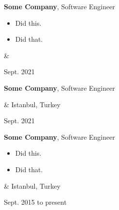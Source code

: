 \documentclass[10pt, letterpaper]{article}
\newenvironment{highlights}{
        \begin{itemize}[
                topsep=0pt,
                parsep=0.10 cm,
                partopsep=0pt,
                itemsep=0pt,
                after=\relax,
                leftmargin=0.4 cm + 3pt
            ]
    }{
        \end{itemize}
    } %
\let\originalTabularx\tabularx
\let\originalEndTabularx\endtabularx
\renewenvironment{tabularx}{\bgroup\centering\originalTabularx}{\originalEndTabularx\par\egroup}
\begin{document}
        \vspace{0.2 cm}
        \begin{tabularx}{
            \textwidth-0.4 cm-0.13cm
        }{
            K{0.2 cm}
            R{4.1 cm}
        }
            \textbf{Some Company}, Software Engineer

            \vspace{0.10 cm}

            \begin{highlights}
                \item Did this.
                \item Did that.
            \end{highlights}
            &
            

            Sept. 2021
        \end{tabularx}

        \vspace{0.2 cm}
        \begin{tabularx}{
            \textwidth-0.4 cm-0.13cm
        }{
            K{0.2 cm}
            R{4.1 cm}
        }
            \textbf{Some Company}, Software Engineer

            \vspace{0.10 cm}

            &
            Istanbul, Turkey

            Sept. 2021
        \end{tabularx}

        \vspace{0.2 cm}
        \begin{tabularx}{
            \textwidth-0.4 cm-0.13cm
        }{
            K{0.2 cm}
            R{4.1 cm}
        }
            \textbf{Some Company}, Software Engineer

            \vspace{0.10 cm}

            \begin{highlights}
                \item Did this.
                \item Did that.
            \end{highlights}
            &
            Istanbul, Turkey

            Sept. 2015 to present
        \end{tabularx}
\end{document}
